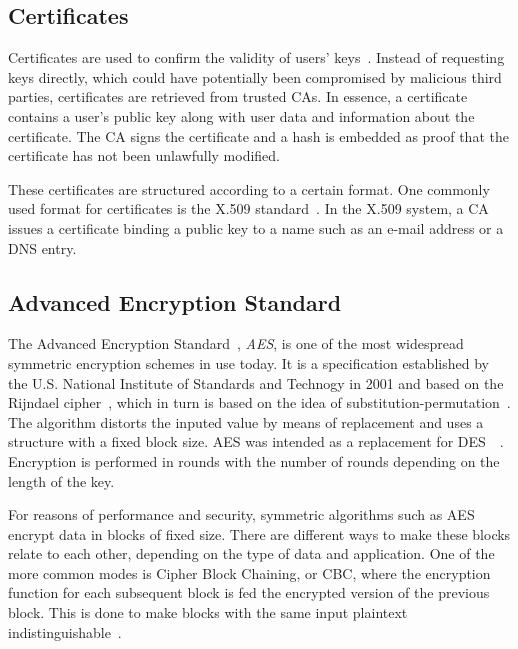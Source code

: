 \subsection{Certificates}
Certificates are used to confirm the validity of users' keys~\cite{EETimesCrypto:Online}. Instead of requesting keys directly, which could have potentially been compromised by malicious third parties, certificates are retrieved from trusted CAs. In essence, a certificate contains a user's public key along with user data and information about the certificate. The CA signs the certificate and a hash is embedded as proof that the certificate has not been unlawfully modified.

These certificates are structured according to a certain format. One commonly used format for certificates is the X.509 standard~\cite{IETFX509:Online}. In the X.509 system, a CA issues a certificate binding a public key to a name such as an e-mail address or a DNS entry.

\subsection{Advanced Encryption Standard}

The Advanced Encryption Standard~\cite{AES:2001}, \emph{AES}, is one of the most widespread symmetric encryption schemes in use today. It is a specification established by the U.S. National Institute of Standards and Technogy in 2001 and based on the Rijndael cipher~\cite{Rijndael:Online}, which in turn is based on the idea of substitution-permutation~\cite{AESISFAST:Online}. The algorithm distorts the inputed value by means of replacement and uses a structure with a fixed block size. AES was intended as a replacement for DES~\cite{DES:1977}~\cite{Cisco:2001}. Encryption is performed in rounds with the number of rounds depending on the length of the key.

For reasons of performance and security, symmetric algorithms such as AES encrypt data in blocks of fixed size. There are different ways to make these blocks relate to each other, depending on the type of data and application. One of the more common modes is Cipher Block Chaining, or CBC, where the encryption function for each subsequent block is fed the encrypted version of the previous block. This is done to make blocks with the same input plaintext indistinguishable~\cite{SearchSecurityCipherBlockChaining:Online}.
